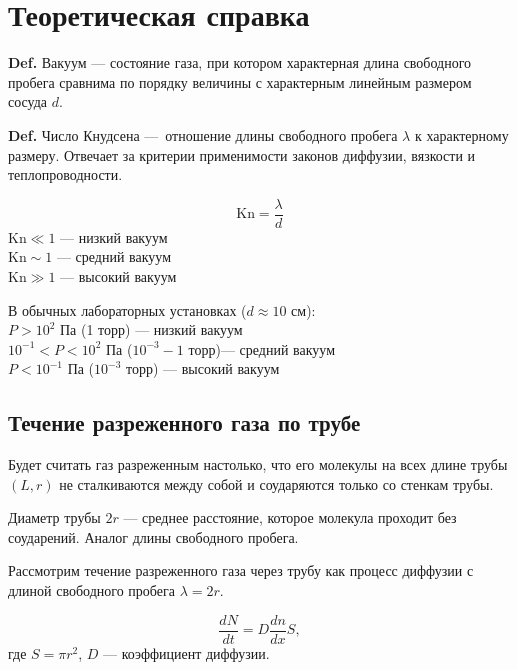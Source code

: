 \documentclass[a4paper,12pt]{article} %
\begin{document}
\section*{Теоретическая справка}

\textbf{Def.} Вакуум — состояние газа, при котором характерная длина свободного пробега сравнима по порядку величины с характерным линейным размером сосуда $d$.

\textbf{Def.} Число Кнудсена — отношение длины свободного пробега $\lambda$ к характерному размеру. Отвечает за критерии применимости законов диффузии, вязкости и теплопроводности.

\begin{equation}
  \text{Kn} = \frac{\lambda}{d}
\end{equation}
$\text{Kn} \ll 1$ — низкий вакуум \\
$\text{Kn} \sim 1$ — средний вакуум \\
$\text{Kn} \gg 1$ — высокий вакуум 

\smallskip

\noindent В обычных лабораторных установках ($d \approx 10$ см): \\
$P > 10^2$ Па (1 торр) — низкий вакуум \\
$10^{-1} < P < 10^2$ Па ($10^{-3}-1$ торр)— средний вакуум \\
$P < 10^{-1}$ Па ($10^{-3}$ торр) — высокий вакуум 

\subsection*{Течение разреженного газа по трубе}

Будет считать газ разреженным настолько, что его молекулы на всех длине трубы $(L, r)$ не сталкиваются между собой и соударяются только со стенкам трубы.

Диаметр трубы $2r$ — среднее расстояние, которое молекула  проходит без соударений. Аналог длины свободного пробега.

Рассмотрим течение разреженного газа через трубу как процесс диффузии с длиной свободного пробега $\lambda = 2r$. 

\begin{equation}
  \label{dN_dt}
  \frac{dN}{dt} = D \frac{dn}{dx} S,
\end{equation}
где $S = \pi r^2$, $D$ — коэффициент диффузии.
\end{document}
